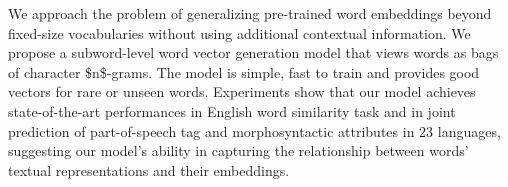 We approach the problem of generalizing pre-trained word embeddings beyond fixed-size vocabularies without using additional contextual information. We propose a subword-level word vector generation model that views words as bags of character \$n\$-grams.  The model is simple, fast to train and provides good vectors for rare or unseen words. Experiments show that our model achieves state-of-the-art performances in English word similarity task and in joint prediction of part-of-speech tag and morphosyntactic attributes in 23 languages, suggesting our model's ability in capturing the relationship between words' textual representations and their embeddings.
